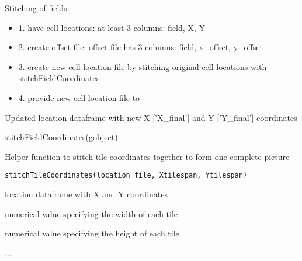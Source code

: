 \documentclass[a4paper]{book}
\begin{document}
\begin{Details}\relax
Stitching of fields:
\begin{itemize}

\item{} 1. have cell locations: at least 3 columns: field, X, Y
\item{} 2. create offset file: offset file has 3 columns: field, x\_offset, y\_offset
\item{} 3. create new cell location file by stitching original cell locations with stitchFieldCoordinates
\item{} 4. provide new cell location file to 

\end{itemize}

\end{Details}
%
\begin{Value}
Updated location dataframe with new X ['X\_final'] and Y ['Y\_final'] coordinates
\end{Value}
%
\begin{Examples}
\begin{ExampleCode}
    stitchFieldCoordinates(gobject)
\end{ExampleCode}
\end{Examples}
%
\begin{Description}\relax
Helper function to stitch tile coordinates together to form one complete picture
\end{Description}
%
\begin{Usage}
\begin{verbatim}
stitchTileCoordinates(location_file, Xtilespan, Ytilespan)
\end{verbatim}
\end{Usage}
%
\begin{Arguments}
\begin{ldescription}
\item[\code{location\_file}] location dataframe with X and Y coordinates

\item[\code{Xtilespan}] numerical value specifying the width of each tile

\item[\code{Ytilespan}] numerical value specifying the height of each tile
\end{ldescription}
\end{Arguments}
%
\begin{Details}\relax
...
\end{Details}
\end{document}
